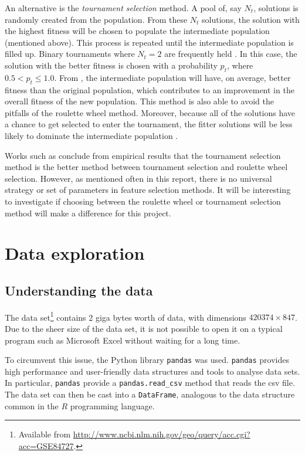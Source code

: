 \documentclass[12pt, twoside, a4paper]{report}
\begin{document}
An alternative is the \textit{tournament selection} method. A pool of, say $N_t$, solutions is randomly created from the population. From these $N_t$ solutions, the solution with the highest fitness will be chosen to populate the intermediate population (mentioned above). This process is repeated until the intermediate population is filled up.  Binary tournaments where $N_t=2$ are frequently held \cite{RefWorks:242, RefWorks:243}. In this case, the solution with the better fitness is chosen with a probability $p_t$, where $0.5 < p_t \leq 1.0$. From \cite{RefWorks:242}, the intermediate population will have, on average, better fitness than the original population, which contributes to an improvement in the overall fitness of the new population. This method is also able to avoid the pitfalls of the roulette wheel method. Moreover, because all of the solutions have a chance to get selected to enter the tournament, the fitter solutions will be less likely to dominate the intermediate population \cite{RefWorks:245}.

Works such as \cite{RefWorks:245, RefWorks:246} conclude from empirical results that the tournament selection method is the better method between tournament selection and roulette wheel selection. However, as mentioned often in this report, there is no universal strategy or set of parameters in feature selection methods. It will be interesting to investigate if choosing between the roulette wheel or tournament selection method will make a difference for this project.


\chapter{Data exploration}
\section{Understanding the data} \label{data:understanding}

The data set\footnote{Available from \url{http://www.ncbi.nlm.nih.gov/geo/query/acc.cgi?acc=GSE84727}.} contains 2 giga bytes worth of data, with dimensions $420374 \times 847$. Due to the sheer size of the data set, it is not possible to open it on a typical program such as Microsoft Excel without waiting for a long time.

To circumvent this issue, the Python library \texttt{pandas} \cite{RefWorks:213} was used. \texttt{pandas} provides high performance and user-friendly data structures and tools to analyse data sets. In particular, \texttt{pandas} provide a \texttt{pandas.read\_csv} method that reads the csv file. The data set can then be cast into a \texttt{DataFrame}, analogous to the data structure common in the $R$ programming language.
\end{document}
